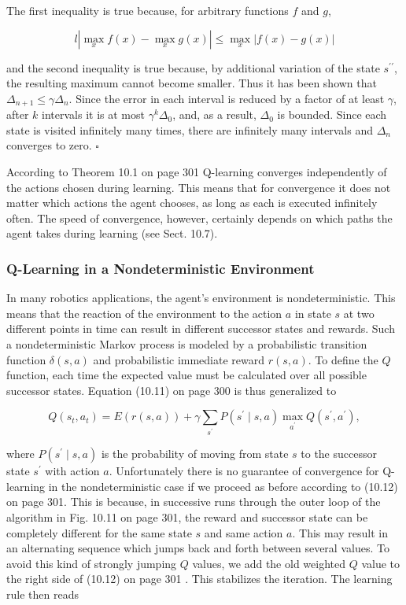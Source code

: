 \documentclass[10pt]{article}
\begin{document}
The first inequality is true because, for arbitrary functions $f$ and $g$,

$$
l\left|\max _{x} f(x)-\max _{x} g(x)\right| \leq \max _{x}|f(x)-g(x)|
$$

and the second inequality is true because, by additional variation of the state $s^{\prime \prime}$, the resulting maximum cannot become smaller. Thus it has been shown that $\Delta_{n+1} \leq \gamma \Delta_{n}$. Since the error in each interval is reduced by a factor of at least $\gamma$, after $k$ intervals it is at most $\gamma^{k} \Delta_{0}$, and, as a result, $\Delta_{0}$ is bounded. Since each state is visited infinitely many times, there are infinitely many intervals and $\Delta_{n}$ converges to zero. \(\square\)

According to Theorem 10.1 on page 301 Q-learning converges independently of the actions chosen during learning. This means that for convergence it does not matter which actions the agent chooses, as long as each is executed infinitely often. The speed of convergence, however, certainly depends on which paths the agent takes during learning (see Sect. 10.7).

\subsubsection*{Q-Learning in a Nondeterministic Environment}
In many robotics applications, the agent's environment is nondeterministic. This means that the reaction of the environment to the action $a$ in state $s$ at two different points in time can result in different successor states and rewards. Such a nondeterministic Markov process is modeled by a probabilistic transition function $\delta(s, a)$ and probabilistic immediate reward $r(s, a)$. To define the $Q$ function, each time the expected value must be calculated over all possible successor states. Equation (10.11) on page 300 is thus generalized to


\begin{equation*}
Q\left(s_{t}, a_{t}\right)=E(r(s, a))+\gamma \sum_{s^{\prime}} P\left(s^{\prime} \mid s, a\right) \max _{a^{\prime}} Q\left(s^{\prime}, a^{\prime}\right), \tag{10.13}
\end{equation*}


where $P\left(s^{\prime} \mid s, a\right)$ is the probability of moving from state $s$ to the successor state $s^{\prime}$ with action $a$. Unfortunately there is no guarantee of convergence for Q-learning in the nondeterministic case if we proceed as before according to (10.12) on page 301. This is because, in successive runs through the outer loop of the algorithm in Fig. 10.11 on page 301, the reward and successor state can be completely different for the same state $s$ and same action $a$. This may result in an alternating sequence which jumps back and forth between several values. To avoid this kind of strongly jumping $Q$ values, we add the old weighted $Q$ value to the right side of (10.12) on page 301 . This stabilizes the iteration. The learning rule then reads
\end{document}
